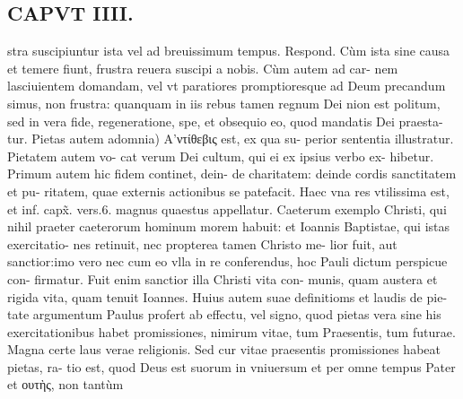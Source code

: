 \documentclass{article}
\begin{document}
\begin{pages}
\section*{CAPVT  IIII. }
\marginpar{[ p.211 ]}\pstart stra suscipiuntur ista vel ad breuissimum tempus. Respond. Cùm ista sine causa et temere fiunt, frustra reuera suscipi a nobis. Cùm autem ad car- nem lasciuientem domandam, vel vt paratiores promptioresque ad Deum precandum simus, non frustra: quanquam in iis rebus tamen regnum Dei nion est politum, sed in vera fide, regeneratione, spe, et obsequio eo, quod mandatis Dei praesta- tur.  \pend\pstart Pietas autem adomnia) Α'ντίθεβις est, ex qua su- perior sententia illustratur. Pietatem autem vo- cat verum Dei cultum, qui ei ex ipsius verbo ex- hibetur. Primum autem hic fidem continet, dein- de charitatem: deinde cordis sanctitatem et pu- ritatem, quae externis actionibus se patefacit. Haec vna res vtilissima est, et inf. capx̃. vers.6. magnus quaestus appellatur. Caeterum exemplo Christi, qui nihil praeter caeterorum hominum morem habuit: et Ioannis Baptistae, qui istas exercitatio- nes retinuit, nec propterea tamen Christo me- lior fuit, aut sanctior:imo vero nec cum eo vlla in re conferendus, hoc Pauli dictum perspicue con- firmatur. Fuit enim sanctior illa Christi vita con- munis, quam austera et rigida vita, quam tenuit Ioannes.  \pend\pstart Huius autem suae definitioms et laudis de pie- tate argumentum Paulus profert ab effectu, vel signo, quod pietas vera sine his exercitationibus habet promissiones, nimirum vitae, tum Praesentis, tum futurae. Magna certe laus verae religionis. Sed cur vitae praesentis promissiones habeat pietas, ra- tio est, quod Deus est suorum in vniuersum et per omne tempus Pater et ουτὴς, non tantùm  \pend

\end{pages}
\end{document}
